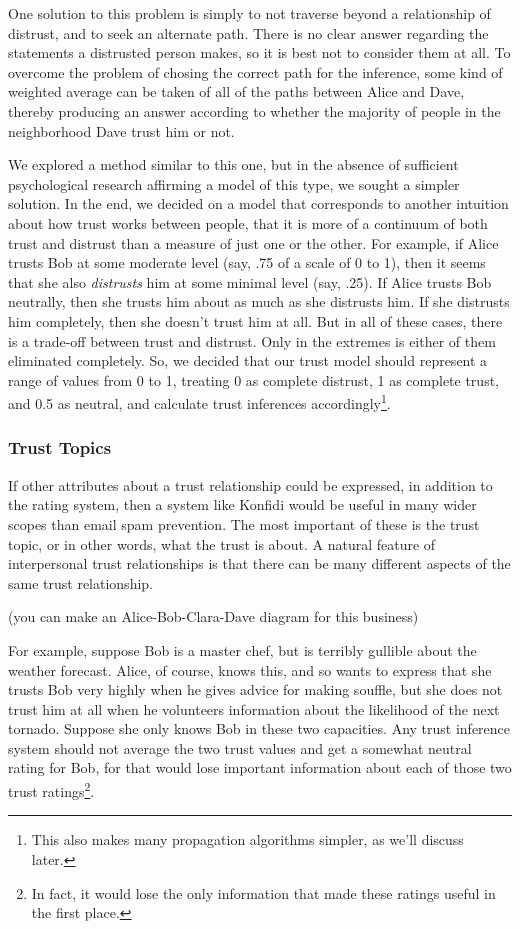 \documentclass[onecolumn]{acm_proc_article-sp}
\begin{document}
One solution to this problem is simply to not traverse beyond a relationship of distrust, and to seek an alternate path.  There is no clear answer regarding the statements a distrusted person makes, so it is best not to consider them at all.
To overcome the problem of chosing the correct path for the inference, some kind of weighted average can be taken of all of the paths between Alice and Dave, thereby producing an answer according to whether the majority of people in the neighborhood Dave trust him or not.

We explored a method similar to this one, but in the absence of sufficient psychological research affirming a model of this type, we sought a simpler solution.  In the end, we decided on a model that corresponds to another intuition about how trust works between people, that it is more of a continuum of both trust and distrust than a measure of just one or the other.  For example, if Alice trusts Bob at some moderate level (say, .75 of a scale of 0 to 1), then it seems that she also \textit{distrusts} him at some minimal level (say, .25).  If Alice trusts Bob neutrally, then she trusts him about as much as she distrusts him.  If she distrusts him completely, then she doesn't trust him at all.  But in all of these cases, there is a trade-off between trust and distrust.  Only in the extremes is either of them eliminated completely.  So, we decided that our trust model should represent a range of values from 0 to 1, treating 0 as complete distrust, 1 as complete trust, and 0.5 as neutral, and calculate trust inferences accordingly\footnote{This also makes many propagation algorithms simpler, as we'll discuss later.}.

\subsubsection{Trust Topics}
If other attributes about a trust relationship could be expressed, in addition to the rating system, then a system like Konfidi would be useful in many wider scopes than email spam prevention.  The most important of these is the trust topic, or in other words, what the trust is about.  A natural feature of interpersonal trust relationships is that there can be many different aspects of the same trust relationship.  

(you can make an Alice-Bob-Clara-Dave diagram for this business)

For example, suppose Bob is a master chef, but is terribly gullible about the weather forecast.  Alice, of course, knows this, and so wants to express that she trusts Bob very highly when he gives advice for making souffle, but she does not trust him at all when he volunteers information about the likelihood of the next tornado.  Suppose she only knows Bob in these two capacities.  Any trust inference system should not average the two trust values and get a somewhat neutral rating for Bob, for that would lose important information about each of those two trust ratings\footnote{In fact, it would lose the only information that made these ratings useful in the first place.}.
\end{document}
